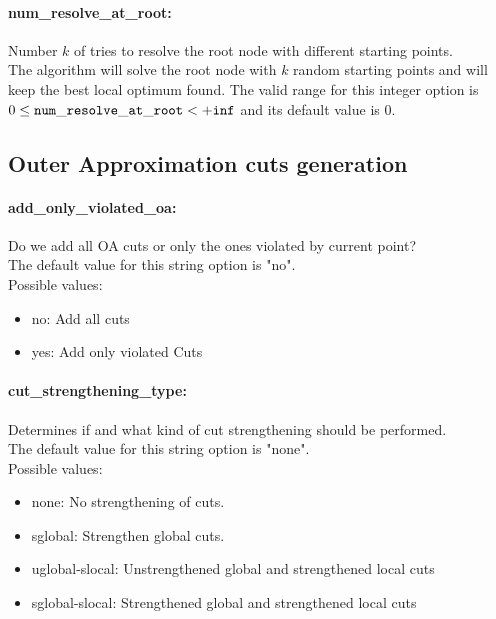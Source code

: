 \paragraph{num\_resolve\_at\_root:} Number $k$ of tries to resolve the root node with different starting points. $\;$ \\
 The algorithm will solve the root node with $k$
random starting points and will keep the best
local optimum found. The valid range for this integer option is
$0 \le {\tt num\_resolve\_at\_root } <  {\tt +inf}$
and its default value is $0$.


\subsection{Outer Approximation cuts generation}
\label{sec:Outer_Approximation_cuts_generation}
\paragraph{add\_only\_violated\_oa:} Do we add all OA cuts or only the ones violated by current point? $\;$ \\

The default value for this string option is "no".
\\ 
Possible values:
\begin{itemize}
   \item no: Add all cuts
   \item yes: Add only violated Cuts
\end{itemize}

\paragraph{cut\_strengthening\_type:} Determines if and what kind of cut strengthening should be performed. $\;$ \\

The default value for this string option is "none".
\\ 
Possible values:
\begin{itemize}
   \item none: No strengthening of cuts.
   \item sglobal: Strengthen global cuts.
   \item uglobal-slocal: Unstrengthened global and strengthened local
cuts
   \item sglobal-slocal: Strengthened global and strengthened local cuts
\end{itemize}

